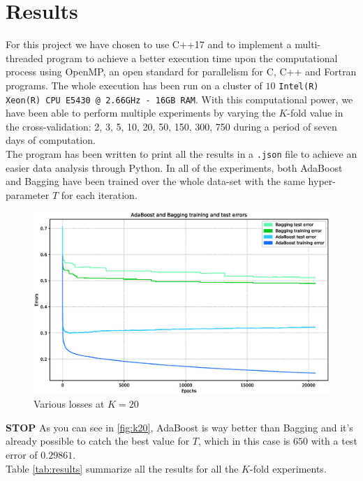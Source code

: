 
\chapter{Results}
For this project we have chosen to use C++17 and to implement a multi-threaded program to achieve a better execution time upon the computational process using OpenMP, an open standard for parallelism for C, C++ and Fortran programs. The whole execution has been run on a cluster of $10$ \texttt{Intel(R) Xeon(R) CPU E5430 @ 2.66GHz - 16GB RAM}. With this computational power, we have been able to perform multiple experiments by varying the $K$-fold value in the cross-validation: 2, 3, 5, 10, 20, 50, 150, 300, 750 during a period of seven days of computation.\\
The program has been written to print all the results in a \texttt{.json} file to achieve an easier data analysis through Python. In all of the experiments, both AdaBoost and Bagging have been trained over the whole data-set with the same hyper-parameter $T$ for each iteration.\\
\begin{figure}[htpb]
	\centering
	\includegraphics[scale=0.35]{figs/report_k20.eps}
	\caption{Various losses at $K = 20$}
	\label{fig:k20}
\end{figure}
\textbf{STOP}
As you can see in \autoref{fig:k20}, AdaBoost is way better than Bagging and it's already possible to catch the best value for $T$, which in this case is $650$ with a test error of $0.29861$.\\
Table \autoref{tab:results} summarize all the results for all the $K$-fold experiments.

